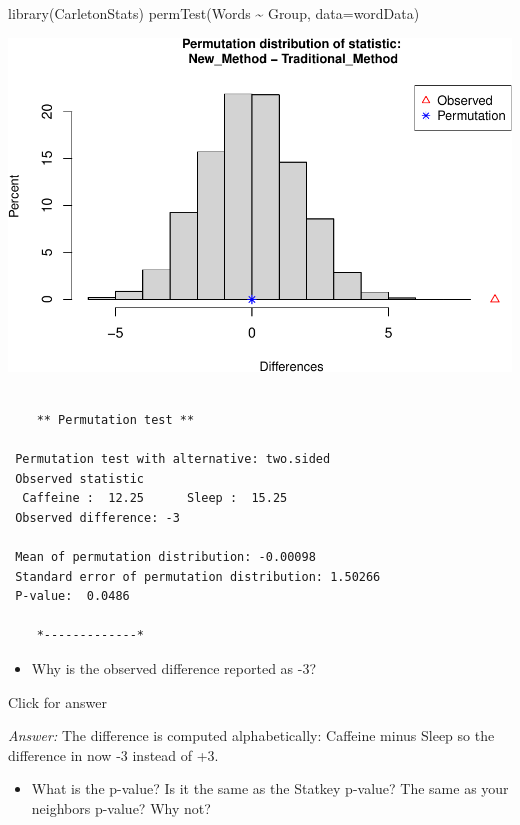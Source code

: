 \documentclass[
]{book}
\newenvironment{Shaded}{\begin{snugshade}}{\end{snugshade}}
\newcommand{\AttributeTok}[1]{\textcolor[rgb]{0.77,0.63,0.00}{#1}}
\newcommand{\FunctionTok}[1]{\textcolor[rgb]{0.00,0.00,0.00}{#1}}
\newcommand{\NormalTok}[1]{#1}
\newcommand{\SpecialCharTok}[1]{\textcolor[rgb]{0.00,0.00,0.00}{#1}}
\providecommand{\tightlist}{%
  \setlength{\itemsep}{0pt}\setlength{\parskip}{0pt}}
\begin{document}
\begin{Shaded}
\begin{Highlighting}[]
\FunctionTok{library}\NormalTok{(CarletonStats)}
\FunctionTok{permTest}\NormalTok{(Words }\SpecialCharTok{\textasciitilde{}}\NormalTok{ Group, }\AttributeTok{data=}\NormalTok{wordData)}
\end{Highlighting}
\end{Shaded}

\includegraphics[width=1\linewidth]{Class_Activity_13_files/figure-latex/unnamed-chunk-2-1}

\begin{verbatim}

    ** Permutation test **

 Permutation test with alternative: two.sided 
 Observed statistic
  Caffeine :  12.25      Sleep :  15.25 
 Observed difference: -3 

 Mean of permutation distribution: -0.00098 
 Standard error of permutation distribution: 1.50266 
 P-value:  0.0486 

    *-------------*
\end{verbatim}

\begin{itemize}
\tightlist
\item
  Why is the observed difference reported as -3?
\end{itemize}

Click for answer

\emph{Answer:} The difference is computed alphabetically: Caffeine minus Sleep so the difference in now -3 instead of +3.

\begin{itemize}
\tightlist
\item
  What is the p-value? Is it the same as the Statkey p-value? The same as your neighbors p-value? Why not?
\end{itemize}
\end{document}
